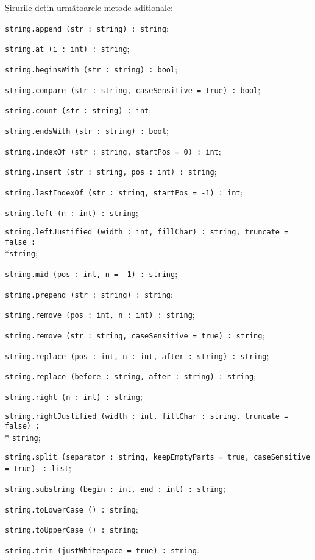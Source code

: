 Șirurile dețin următoarele metode adiționale:
\begin{icItems}
	\item \texttt{string.append (str : string) : string};
	\item \texttt{string.at (i : int) : string};
	\item \texttt{string.beginsWith (str : string) : bool};
	\item \texttt{string.compare (str : string, caseSensitive = true) : bool};
	\item \texttt{string.count (str : string) : int};
	\item \texttt{string.endsWith (str : string) : bool};
	\item \texttt{string.indexOf (str : string, startPos = 0) : int};
	\item \texttt{string.insert (str : string, pos : int) : string};
	\item
	\texttt{string.lastIndexOf (str : string, startPos = -1) : int};
	\item \texttt{string.left (n : int) : string};
	\item \texttt{string.leftJustified (width : int, fillChar) : string, truncate = false :}\\*\texttt{string};
	\item \texttt{string.mid (pos : int, n = -1) : string};
	\item \texttt{string.prepend (str : string) : string};
	\item \texttt{string.remove (pos : int, n : int) : string};
	\item \texttt{string.remove (str : string, caseSensitive = true) : string};
	\item \texttt{string.replace (pos : int, n : int, after : string) : string};
	\item \texttt{string.replace (before : string, after : string) : string};
	\item \texttt{string.right (n : int) : string};
	\item \texttt{string.rightJustified (width : int, fillChar : string, truncate = false) :}\\* \texttt{string};
	\item \texttt{string.split (separator : string, keepEmptyParts = true, caseSensitive = true) } \texttt{: list};
	\item \texttt{string.substring (begin : int, end : int) : string};
	\item \texttt{string.toLowerCase () : string};
	\item \texttt{string.toUpperCase () : string};
	\item \texttt{string.trim (justWhitespace = true) : string}.
\end{icItems}

